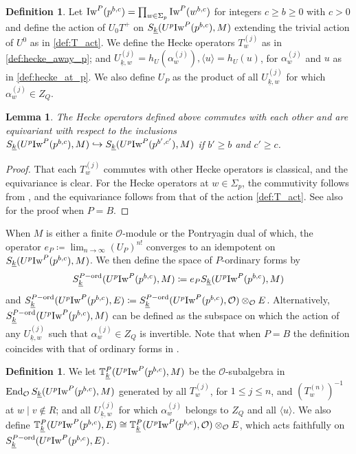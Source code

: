 \documentclass[leqno]{amsart}
\newtheorem{lem}[thm]{Lemma}
\theoremstyle{definition}
\newtheorem{defn}[thm]{Definition}
\theoremstyle{remark}
\newcommand{\oo}{\mathcal{O}}
\DeclareMathOperator{\End}{End}
\newcommand{\wt}[1]{\underline{ #1 }}
\newcommand{\Iw}{\textnormal{Iw}} %
\newcommand{\TT}{\mathbb{T}} %
\newcommand{\ord}{\textnormal{ord}} %
\begin{document}
\begin{defn}\label{def:hecke}
Let $\Iw^P(p^{b,c})=\prod_{w\in \Sigma_p}\Iw^P(w^{b,c})$
for integers  $c\geq b\geq 0$ with $c>0$
and define the action of $U_0T^+$ 
on $S_{\wt{k}}(U^p\Iw^P(p^{b,c}),M)$
extending the trivial action of $U^0$ as in \eqref{def:T_act}.
We define the Hecke operators $T_w^{(j)}$
as in \eqref{def:hecke_away_p}; and 
$U_{\wt{k},w}^{(j)}=h_U(\alpha_w^{(j)}),\langle u\rangle=h_U(u)$,
for $\alpha_w^{(j)}$ and $u$ as in \eqref{def:hecke_at_p}.
We also define $U_P$
as the product of all  $U_{\wt{k},w}^{(j)}$
for which $\alpha_w^{(j)}\in Z_Q$.
\end{defn}


\begin{lem}
The Hecke operators defined above commutes with each other
and are equivariant with respect to the inclusions
$ S_{\wt{k}}(U^p\Iw^P(p^{b,c}),M)\hookrightarrow
S_{\wt{k}}(U^p\Iw^P(p^{b',c'}),M)$
if $b'\geq b$ and $c'\geq c$.
\end{lem}
\begin{proof}
That each $T_w^{(j)}$ commutes with other Hecke operators is classical,
and the equivariance is clear.
For the Hecke operators at  $w\in \Sigma_p$,
the commutivity follows from \cite[Lem 3.1.4]{emeI},
and the equivariance follows from 
that of the action \eqref{def:T_act}.
See also \cite[Lem 2.10]{ger} for the proof when $P=B$.
\end{proof}


When $M$ is either a finite  $\oo$-module
or the Pontryagin dual of which,
the operator $e_P\coloneqq\lim_{n\to \infty}(U_P)^{n!}$
converges to an idempotent 
on $S_{\wt{k}}(U^p\Iw^P(p^{b,c}),M)$.
We then define the space of $P$-ordinary forms by
\[
	S_{\wt{k}}^{P-\ord}(U^p\Iw^P(p^{b,c}),M)\coloneqq
	e_PS_{\wt{k}}(U^p\Iw^P(p^{b,c}),M)
\]
and $S_{\wt{k}}^{P-\ord}(U^p\Iw^P(p^{b,c}),E)\coloneqq 
S_{\wt{k}}^{P-\ord}(U^p\Iw^P(p^{b,c}),\oo)\otimes_{\oo}E$.
Alternatively,
$S_{\wt{k}}^{P-\ord}(U^p\Iw^P(p^{b,c}),M)$
can be defined as the subspace on which the action of
any  $U_{\wt{k},w}^{(j)}$ such that 
$\alpha_w^{(j)}\in Z_Q$ is invertible.
Note that when $P=B$ the definition coincides with 
that of ordinary forms in \cite[Def 2.13]{ger}.

\begin{defn}\label{def:ord_hecke}
	We let $\TT^P_{\wt{k}}(U^p\Iw^P(p^{b,c}),M)$
	be the $\oo$-subalgebra in 
	$\End_{\oo}S_{\wt{k}}(U^p\Iw^P(p^{b,c}),M)$
	generated by all
	$T_w^{(j)}$, for $1\leq j\leq n$,
	and $(T_w^{(n)})^{-1}$ at $w\mid v\notin R$;
	and all $U_{\wt{k},w}^{(j)}$ 
	for which $\alpha_w^{(j)}$  belongs to  $Z_Q$
	and all $\langle u\rangle$.
	We also define 
	$\TT^P_{\wt{k}}(U^p\Iw^P(p^{b,c}),E)\cong
	\TT^P_{\wt{k}}(U^p\Iw^P(p^{b,c}),\oo)\otimes_{\oo}E$,
	which acts faithfully on 
	$S_{\wt{k}}^{P-\ord}(U^p\Iw^P(p^{b,c}),E)$.
\end{defn}
\end{document}
